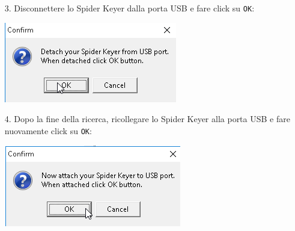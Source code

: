 \pagebreak
\begin{enumerate}
		\item[3.] Disconnettere lo Spider Keyer dalla porta USB e fare click su \texttt{OK}:
	\begin{center}
		\includegraphics[width=\linewidth]{./hamracer03.png}
	\end{center}
		\item[4.] Dopo la fine della ricerca, ricollegare lo Spider Keyer alla porta USB e fare nuovamente click su \texttt{OK}:
	\begin{center}
		\includegraphics[width=\linewidth]{./hamracer04.png}
	\end{center}
\end{enumerate}

